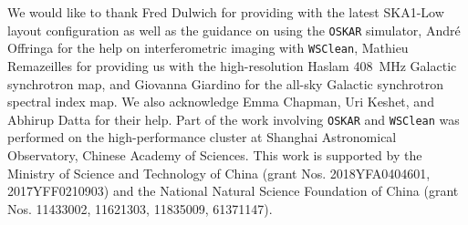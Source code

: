 \documentclass[twocolumn]{aastex62}
\begin{document}
\acknowledgments

We would like to thank
Fred Dulwich for providing with the latest SKA1-Low layout configuration
as well as the guidance on using the \texttt{OSKAR} simulator,
Andr\'e Offringa for the help on interferometric imaging with
\texttt{WSClean},
Mathieu Remazeilles for providing us with the high-resolution Haslam
\SI{408}{\MHz} Galactic synchrotron map,
and Giovanna Giardino for the all-sky Galactic synchrotron spectral
index map.
We also acknowledge Emma Chapman, Uri Keshet, and Abhirup Datta for
their help.
Part of the work involving \texttt{OSKAR} and \texttt{WSClean} was
performed on the high-performance cluster at Shanghai Astronomical
Observatory, Chinese Academy of Sciences.
This work is supported by
the Ministry of Science and Technology of China
(grant Nos. 2018YFA0404601, 2017YFF0210903)
and the National Natural Science Foundation of China
(grant Nos. 11433002, 11621303, 11835009, 61371147).


%

\vspace{5mm}




\appendix
\end{document}
